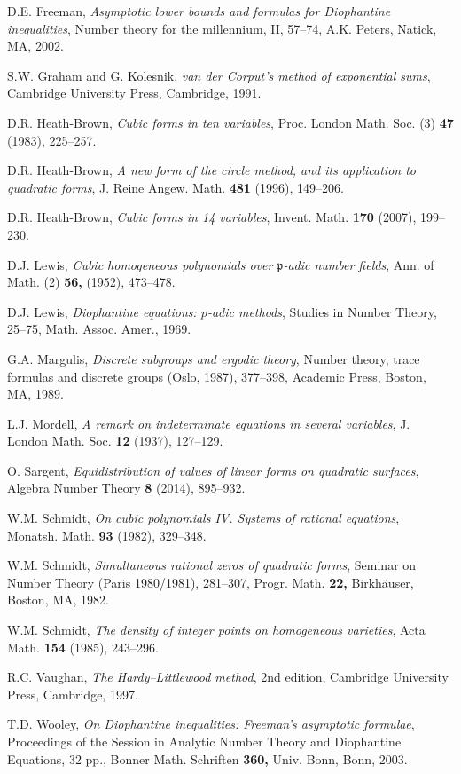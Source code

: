 \documentclass[12pt,reqno]{amsart}
\theoremstyle{definition}
\theoremstyle{remark}
\numberwithin{equation}{section}
\begin{document}
\begin{thebibliography}{50}
D.E. Freeman, \emph{Asymptotic lower bounds and formulas for Diophantine inequalities}, Number theory for the millennium, II, 57--74, A.K. Peters, Natick, MA, 2002. 

S.W. Graham and G. Kolesnik, \emph{van der Corput's method of exponential sums}, Cambridge University Press, Cambridge, 1991.

D.R. Heath-Brown, \emph{Cubic forms in ten variables}, Proc. London Math. Soc. (3) \textbf{47} (1983), 225--257. 

D.R. Heath-Brown, \emph{A new form of the circle method, and its application to quadratic forms}, 
J. Reine Angew. Math. \textbf{481} (1996), 149--206. 

D.R. Heath-Brown, \emph{Cubic forms in 14 variables}, Invent. Math. \textbf{170} (2007), 199--230. 

D.J. Lewis, \emph{Cubic homogeneous polynomials over ${\mathfrak p}$-adic number fields}, 
Ann. of Math. (2) \textbf{56,} (1952), 473--478. 

D.J. Lewis, \emph{Diophantine equations: $p$-adic methods}, Studies in Number Theory, 25--75, Math. Assoc. Amer., 1969.

G.A. Margulis, \emph{Discrete subgroups and ergodic theory}, Number theory, trace formulas and discrete groups (Oslo, 1987), 377--398, Academic Press, Boston, MA, 1989.

L.J. Mordell, \emph{A remark on indeterminate equations in several variables}, J. London Math. Soc. \textbf{12} (1937), 127--129.

O. Sargent, \emph{Equidistribution of values of linear forms on quadratic surfaces}, Algebra Number Theory \textbf{8} (2014), 895--932. 

W.M. Schmidt, \emph{On cubic polynomials IV. Systems of rational equations}, 
Monatsh. Math. \textbf{93} (1982), 329--348. 

W.M. Schmidt, \emph{Simultaneous rational zeros of quadratic forms}, Seminar on Number Theory (Paris 1980/1981), 281--307, Progr. Math. \textbf{22,} Birkh\"auser, Boston, MA, 1982. 

W.M. Schmidt, \emph{The density of integer points on homogeneous varieties}, Acta Math. \textbf{154} (1985), 243--296.

R.C. Vaughan, \emph{The Hardy--Littlewood method}, 2nd edition, Cambridge University Press, Cambridge, 1997.

T.D. Wooley, \emph{On Diophantine inequalities: Freeman's asymptotic formulae}, Proceedings of the Session in Analytic Number Theory and Diophantine Equations, 32 pp., Bonner Math. Schriften \textbf{360,} Univ. Bonn, Bonn, 2003.

\end{thebibliography}
\end{document}
